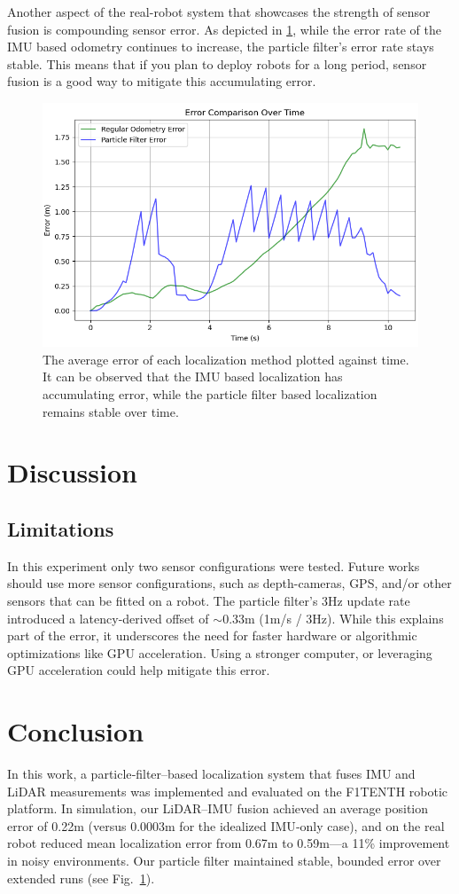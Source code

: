 \documentclass[10.5pt]{article}
\begin{document}
Another aspect of the real-robot system that showcases the strength of sensor fusion is compounding sensor error. As depicted in \ref{fig:error_ot}, while the error rate of the IMU based odometry continues to increase, the particle filter's error rate stays stable. This means that if you plan to deploy robots for a long period, sensor fusion is a good way to mitigate this accumulating error.
\begin{figure}
    \centering
    \includegraphics[width=1\linewidth]{error_plotted.png}
    \caption{The average error of each localization method plotted against time. It can be observed that the IMU based localization has accumulating error, while the particle filter based localization remains stable over time.}
    \label{fig:error_ot}
\end{figure}
\section{Discussion}
\subsection{Limitations}
In this experiment only two sensor configurations were tested. Future works should use more sensor configurations, such as depth-cameras, GPS, and/or other sensors that can be fitted on a robot. The particle filter’s 3Hz update rate introduced a latency-derived offset of \(\sim\)0.33m (1m/s / 3Hz). While this explains part of the error, it underscores the need for faster hardware or algorithmic optimizations like GPU acceleration. Using a stronger computer, or leveraging GPU acceleration could help mitigate this error.

\section{Conclusion}
In this work, a particle‐filter–based localization system that fuses IMU and LiDAR measurements was implemented and evaluated on the F1TENTH robotic platform.  In simulation, our LiDAR–IMU fusion achieved an average position error of 0.22m (versus 0.0003m for the idealized IMU‐only case), and on the real robot reduced mean localization error from 0.67m to 0.59m—a 11\% improvement in noisy environments.  Our particle filter maintained stable, bounded error over extended runs (see Fig.~\ref{fig:error_ot}).
\end{document}
